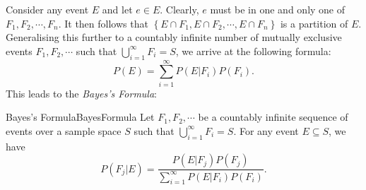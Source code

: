 \documentclass[math]{amznotes}
\theoremstyle{remark}
\begin{document}
Consider any event $E$ and let $e \in E$. Clearly, $e$ must be in one and only one of $F_1, F_2, \cdots, F_n$. It then follows that $\left\{E \cap F_1, E \cap F_2, \cdots, E \cap F_n\right\}$ is a partition of $E$. Generalising this further to a countably infinite number of mutually exclusive events $F_1, F_2, \cdots$ such that $\bigcup_{i = 1}^\infty F_i = S$, we arrive at the following formula:
\begin{equation*}
    P(E) = \sum_{i = 1}^{\infty}P(E|F_i)P(F_i).
\end{equation*}
This leads to the \textit{Bayes's Formula}:
\begin{thmbox}{Bayes's Formula}{BayesFormula}
    Let $F_1, F_2, \cdots$ be a countably infinite sequence of events over a sample space $S$ such that $\bigcup_{i = 1}^\infty F_i = S$. For any event $E \subseteq S$, we have
    \begin{equation*}
        P(F_j|E) = \frac{P(E|F_j)P(F_j)}{\sum_{i = 1}^{\infty}P(E|F_i)P(F_i)}.
    \end{equation*}
\end{thmbox}
\end{document}
